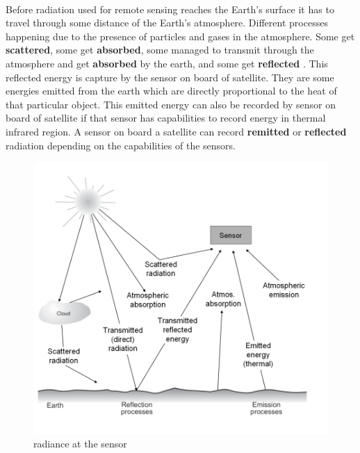 \begin{description}
\paragraph{}
Before radiation used for remote sensing reaches the Earth's surface it has to travel through some distance of the Earth's atmosphere. Different processes happening due to the presence of particles and gases in the atmosphere. Some get \textbf{scattered}, some get \textbf{absorbed}, some managed to transmit through the atmosphere and get \textbf{absorbed}  by the earth, and some get \textbf{reflected} . This reflected energy is capture by the sensor on board of satellite. They are some energies emitted from the earth which are directly proportional to the heat of that particular object. This emitted energy can also be recorded by sensor on board of satellite if that sensor has capabilities to record energy in thermal infrared region. A sensor on board a satellite can record \textbf{remitted}  or \textbf{reflected} radiation depending on the capabilities of the sensors.
\begin{figure}[H]
\begin{center}
\includegraphics[scale=0.8]{image3.png} %
\end{center}
\caption{radiance at the sensor}
\label{radiance at the sensor}%
\end{figure}

\end{description}
